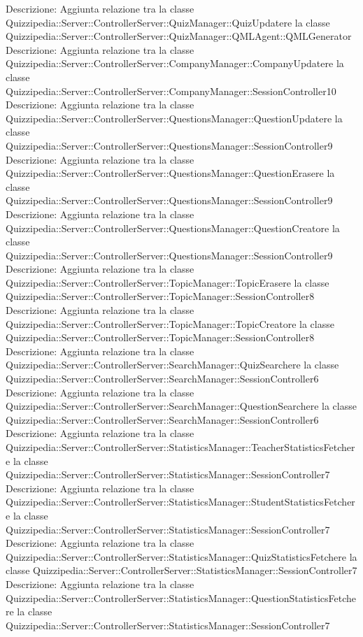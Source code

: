 Descrizione: Aggiunta relazione tra la classe Quizzipedia::Server::ControllerServer::QuizManager::QuizUpdatere la classe Quizzipedia::Server::ControllerServer::QuizManager::QMLAgent::QMLGenerator 
Descrizione: Aggiunta relazione tra la classe Quizzipedia::Server::ControllerServer::CompanyManager::CompanyUpdatere la classe Quizzipedia::Server::ControllerServer::CompanyManager::SessionController10 
Descrizione: Aggiunta relazione tra la classe Quizzipedia::Server::ControllerServer::QuestionsManager::QuestionUpdatere la classe Quizzipedia::Server::ControllerServer::QuestionsManager::SessionController9 
Descrizione: Aggiunta relazione tra la classe Quizzipedia::Server::ControllerServer::QuestionsManager::QuestionErasere la classe Quizzipedia::Server::ControllerServer::QuestionsManager::SessionController9 
Descrizione: Aggiunta relazione tra la classe Quizzipedia::Server::ControllerServer::QuestionsManager::QuestionCreatore la classe Quizzipedia::Server::ControllerServer::QuestionsManager::SessionController9 
Descrizione: Aggiunta relazione tra la classe Quizzipedia::Server::ControllerServer::TopicManager::TopicErasere la classe Quizzipedia::Server::ControllerServer::TopicManager::SessionController8 
Descrizione: Aggiunta relazione tra la classe Quizzipedia::Server::ControllerServer::TopicManager::TopicCreatore la classe Quizzipedia::Server::ControllerServer::TopicManager::SessionController8 
Descrizione: Aggiunta relazione tra la classe Quizzipedia::Server::ControllerServer::SearchManager::QuizSearchere la classe Quizzipedia::Server::ControllerServer::SearchManager::SessionController6 
Descrizione: Aggiunta relazione tra la classe Quizzipedia::Server::ControllerServer::SearchManager::QuestionSearchere la classe Quizzipedia::Server::ControllerServer::SearchManager::SessionController6 
Descrizione: Aggiunta relazione tra la classe Quizzipedia::Server::ControllerServer::StatisticsManager::TeacherStatisticsFetchere la classe Quizzipedia::Server::ControllerServer::StatisticsManager::SessionController7 
Descrizione: Aggiunta relazione tra la classe Quizzipedia::Server::ControllerServer::StatisticsManager::StudentStatisticsFetchere la classe Quizzipedia::Server::ControllerServer::StatisticsManager::SessionController7 
Descrizione: Aggiunta relazione tra la classe Quizzipedia::Server::ControllerServer::StatisticsManager::QuizStatisticsFetchere la classe Quizzipedia::Server::ControllerServer::StatisticsManager::SessionController7 
Descrizione: Aggiunta relazione tra la classe Quizzipedia::Server::ControllerServer::StatisticsManager::QuestionStatisticsFetchere la classe Quizzipedia::Server::ControllerServer::StatisticsManager::SessionController7 
